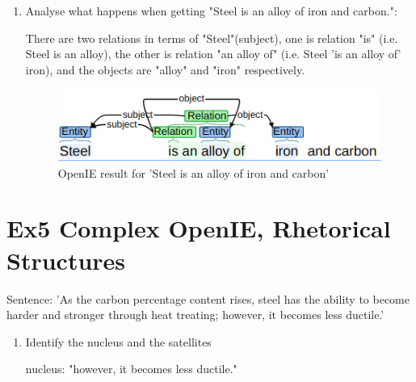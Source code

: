 \documentclass[12pt]{article}
\begin{document}
{\begin{enumerate}[1.]
\begin{center}
	$Steel \rightarrow \exists Contain.Carbon$

	$Steel \rightarrow \exists Contain.Iron$
	\end{center}
	\item Analyse what happens when getting "Steel is an alloy of iron and carbon.":
	
	There are two relations in terms of "Steel"(subject), one is relation "is" (i.e. Steel is an alloy), 
	the other is relation "an alloy of" (i.e. Steel 'is an alloy of' iron), and the objects are "alloy" 
	and "iron" respectively.
	\begin{figure}[ht]
		\centering
		\includegraphics[scale=0.45]{figs/Openie4.png}
		\caption{OpenIE result for 'Steel is an alloy of iron and carbon'}
		\label{fig:label5}
	\end{figure}
\end{enumerate}

\newpage
\section{Ex5 Complex OpenIE, Rhetorical Structures}
\label{sec: ex5}

Sentence: 'As the carbon percentage content rises, steel has the ability to become harder 
and stronger through heat treating; however, it becomes less ductile.'
\begin{enumerate}[1.]
	\item Identify the nucleus and the satellites
	
	nucleus: "however, it becomes less ductile."


\end{enumerate}}
\end{document}
